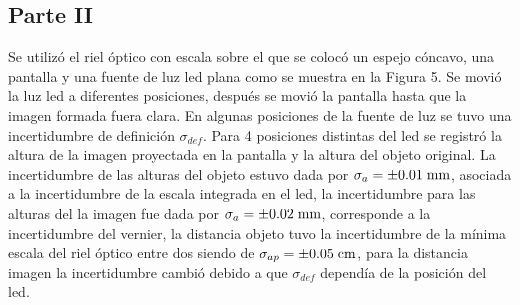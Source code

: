 \documentclass[DIV=calc, paper=a4, fontsize=11pt]{scrartcl}
\begin{document}
\subsection*{\textcolor{carmine}{Parte II}}
Se utilizó el riel óptico con escala sobre el que se colocó un espejo cóncavo, una pantalla y una fuente de luz led plana como se muestra en la Figura 5. Se movió la luz led a diferentes posiciones, después se movió la pantalla hasta que la imagen formada fuera clara. En algunas posiciones de la fuente de luz se tuvo una incertidumbre de definición $\sigma_{def}$. Para 4 posiciones distintas del led se registró la altura de la imagen proyectada en la pantalla y la altura del objeto original. La incertidumbre de las alturas del objeto estuvo dada por $\sigma_{a}=\pm0.01\hspace{0.1cm}\text{mm}$, asociada a la incertidumbre de la escala integrada en el led, la incertidumbre para las alturas del la imagen fue dada por $\sigma_{a}=\pm0.02\hspace{0.1cm}\text{mm}$, corresponde a la incertidumbre del vernier, la distancia objeto tuvo la incertidumbre de la mínima escala del riel óptico entre dos siendo de $\sigma_{ap}=\pm0.05\hspace{0.1cm}\text{cm}$, para la distancia imagen la incertidumbre cambió debido a que $\sigma_{def}$ dependía de la posición del led.
\end{document}
